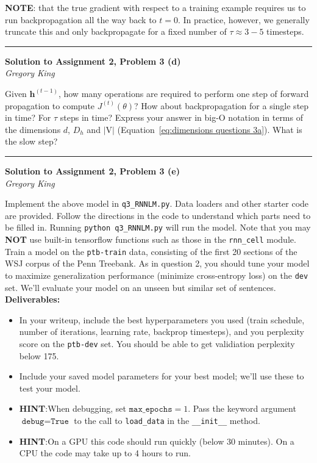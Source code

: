 \documentclass[letter,12pt]{article}
\newcommand{\myhwtitle}[3]
{\begin{center}
{\large {\bf Solution to Assignment {#1}, Problem {#2}}}\\
\medskip 
{\it {#3}} %
\end{center}}
\newcommand{\solutionsAuthor}{Gregory King}
\begin{document}
\noindent\textbf{NOTE}: that the true gradient with respect to a training example requires us to run backpropagation all the way back to $t=0$. In practice, however, we generally truncate this and only backpropagate for a fixed number of $\tau\approx3-5$ timesteps.

\vspace{5mm}
\noindent\rule{\textwidth}{0.4pt}

\clearpage

\myhwtitle{2}{3 (d)}{\solutionsAuthor}

\bigskip

\noindent Given ${\boldsymbol h}^{(t-1)}$, how many operations are required to perform one step of forward propagation to compute $J^{(t)}(\theta)$? How about backpropagation for a single step in time? For $\tau$ steps in time? Express your answer in big-O notation in terms of the dimensions $d$, $D_{h}$ and $|\textrm{V}|$ (Equation~\ref{eq:dimensions questions 3a}). What is the slow step?

\vspace{5mm}
\noindent\rule{\textwidth}{0.4pt}

\clearpage

\myhwtitle{2}{3 (e)}{\solutionsAuthor}

\bigskip

\noindent Implement the above model in \texttt{q3\_RNNLM.py}. Data loaders and other starter code are provided. Follow the directions in the code to understand which parts need to be filled in. Running \texttt{python q3\_RNNLM.py} will run the model. Note that you may \textbf{NOT} use built-in tensorflow functions such as those in the \texttt{rnn\_cell} module.\\

\noindent Train a model on the \texttt{ptb-train} data, consisting of the first 20 sections of the WSJ corpus of the Penn Treebank. As in question 2, you should tune your model to maximize generalization performance (minimize cross-entropy loss) on the \texttt{dev} set. We'll evaluate your model on an unseen but similar set of sentences.\\

{\Large \textbf{Deliverables:}}
\begin{itemize}
\item{In your writeup, include the best hyperparameters you used (train schedule, number of iterations, learning rate, backprop timesteps), and you perplexity score on the \texttt{ptb-dev} set. You should be able to get validiation perplexity below 175.}
\item{Include your saved model parameters for your best model; we'll use these to test your model.}
\item{\textbf{HINT}:When debugging, set $\texttt{max\_epochs} = 1$. Pass the keyword argument $\texttt{debug}=\texttt{True}$ to the call to \texttt{load\_data} in the \texttt{\_\_init\_\_} method.}
\item{\textbf{HINT}:On a GPU this code should run quickly (below 30 minutes). On a CPU the code may take up to 4 hours to run.}
\end{itemize}
\end{document}

